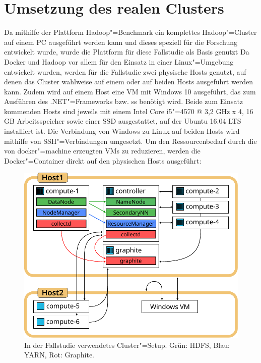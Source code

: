 \section{Umsetzung des realen Clusters}
\label{sec:realCluster}

Da mithilfe der Plattform Hadoop"=Benchmark ein komplettes Hadoop"=Cluster auf einem PC ausgeführt werden kann und dieses speziell für die Forschung entwickelt wurde, wurde die Plattform für diese Fallstudie als Basis genutzt
Da Docker und Hadoop vor allem für den Einsatz in einer Linux"=Umgebung entwickelt wurden, werden für die Fallstudie zwei physische Hosts genutzt, auf denen das Cluster wahlweise auf einem oder auf beiden Hosts ausgeführt werden kann.
Zudem wird auf einem Host eine VM mit Windows 10 ausgeführt, das zum Ausführen des .NET"=Frameworks bzw. \ac{ss} benötigt wird.
Beide zum Einsatz kommenden Hosts sind jeweils mit einem Intel Core i5"=4570 @ 3,2 GHz x 4, 16 GB Arbeitsspeicher sowie einer SSD ausgestattet, auf der Ubuntu 16.04 LTS installiert ist.
Die Verbindung von Windows zu Linux auf beiden Hosts wird mithilfe von SSH"=Verbindungen umgesetzt.
Um den Ressourcenbedarf durch die von docker"=machine erzeugten VMs zu reduzieren, werden die Docker"=Container direkt auf den physischen Hosts ausgeführt:

\begin{figure}[h]
    \includegraphics{./resources/caseStudyHadoopSetup.pdf}
    \caption[In der Fallstudie verwendetes Cluster"=Setup]
    {In der Fallstudie verwendetes Cluster"=Setup.
        Grün: \ac{HDFS}, Blau: YARN, Rot: Graphite.}
    \label{fig:caseStudyHadoopSetup}
\end{figure}

